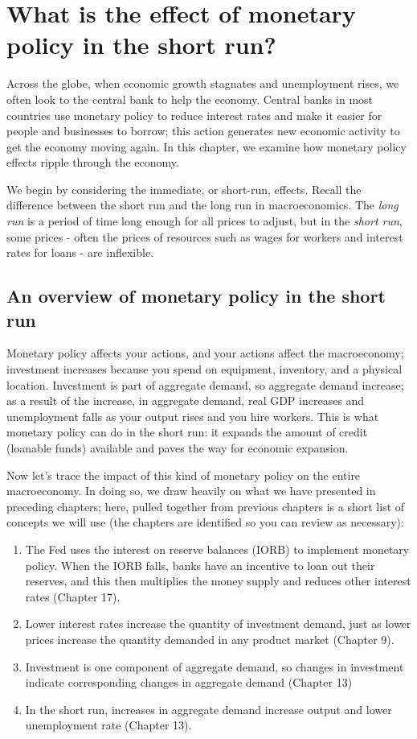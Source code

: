 \documentclass[11pt]{article} %
\begin{document}
\section*{\textbf{What is the effect of monetary policy in the short run?}}
Across the globe, when economic growth stagnates and unemployment rises, we often look to the central bank to help the economy. Central banks in most countries use monetary policy to reduce interest rates and make it easier for people and businesses to borrow; this action generates new economic activity to get the economy moving again. In this chapter, we examine how monetary policy effects ripple through the economy.

We begin by considering the immediate, or short-run, effects. Recall the difference between the short run and the long run in macroeconomics. The \textit{long run} is a period of time long enough for all prices to adjust, but in the \textit{short run}, some prices - often the prices of resources such as wages for workers and interest rates for loans - are inflexible.
\subsection*{An overview of monetary policy in the short run}
Monetary policy affects your actions, and your actions affect the macroeconomy; investment increases because you spend on equipment, inventory, and a physical location. Investment is part of aggregate demand, so aggregate demand increase; as a result of the increase, in aggregate demand, real GDP increases and unemployment falls as your output rises and you hire workers. This is what monetary policy can do in the short run: it expands the amount of credit (loanable funds) available and paves the way for economic expansion.

Now let's trace the impact of this kind of monetary policy on the entire macroeconomy. In doing so, we draw heavily on what we have presented in preceding chapters; here, pulled together from previous chapters is a short list of concepts we will use (the chapters are identified so you can review as necessary):
\begin{enumerate}
\item The Fed uses the interest on reserve balances (IORB) to implement monetary policy. When the IORB falls, banks have an incentive to loan out their reserves, and this then multiplies the money supply and reduces other interest rates (Chapter 17).
\item Lower interest rates increase the quantity of investment demand, just as lower prices increase the quantity demanded in any product market (Chapter 9).
\item Investment is one component of aggregate demand, so changes in investment indicate corresponding changes in aggregate demand (Chapter 13)
\item In the short run, increases in aggregate demand increase output and lower unemployment rate (Chapter 13).
\end{enumerate}
\end{document}
